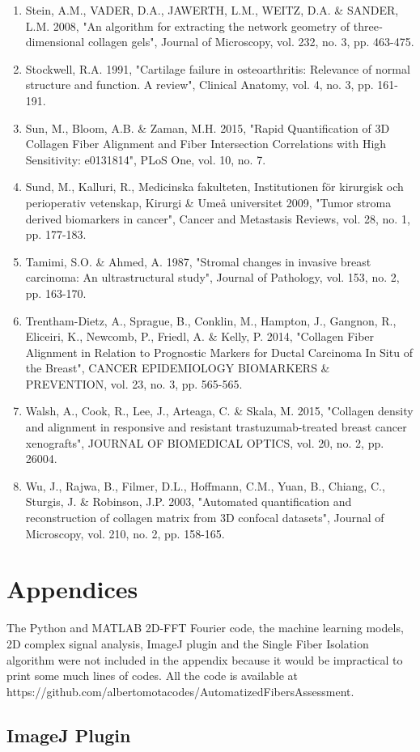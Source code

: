 \documentclass[12pt,a4paper]{article}
\begin{document}
\begin{enumerate}
\item Stein, A.M., VADER, D.A., JAWERTH, L.M., WEITZ, D.A. \& SANDER, L.M. 2008, "An algorithm for extracting the network geometry of three‐dimensional collagen gels", Journal of Microscopy, vol. 232, no. 3, pp. 463-475.
\item Stockwell, R.A. 1991, "Cartilage failure in osteoarthritis: Relevance of normal structure and function. A review", Clinical Anatomy, vol. 4, no. 3, pp. 161-191.
\item Sun, M., Bloom, A.B. \& Zaman, M.H. 2015, "Rapid Quantification of 3D Collagen Fiber Alignment and Fiber Intersection Correlations with High Sensitivity: e0131814", PLoS One, vol. 10, no. 7.
\item Sund, M., Kalluri, R., Medicinska fakulteten, Institutionen för kirurgisk och perioperativ vetenskap, Kirurgi \& Umeå universitet 2009, "Tumor stroma derived biomarkers in cancer", Cancer and Metastasis Reviews, vol. 28, no. 1, pp. 177-183.
\item Tamimi, S.O. \& Ahmed, A. 1987, "Stromal changes in invasive breast carcinoma: An ultrastructural study", Journal of Pathology, vol. 153, no. 2, pp. 163-170.
\item Trentham-Dietz, A., Sprague, B., Conklin, M., Hampton, J., Gangnon, R., Eliceiri, K., Newcomb, P., Friedl, A. \& Kelly, P. 2014, "Collagen Fiber Alignment in Relation to Prognostic Markers for Ductal Carcinoma In Situ of the Breast", CANCER EPIDEMIOLOGY BIOMARKERS \& PREVENTION, vol. 23, no. 3, pp. 565-565.
\item Walsh, A., Cook, R., Lee, J., Arteaga, C. \& Skala, M. 2015, "Collagen density and alignment in responsive and resistant trastuzumab-treated breast cancer xenografts", JOURNAL OF BIOMEDICAL OPTICS, vol. 20, no. 2, pp. 26004.
\item Wu, J., Rajwa, B., Filmer, D.L., Hoffmann, C.M., Yuan, B., Chiang, C., Sturgis, J. \& Robinson, J.P. 2003, "Automated quantification and reconstruction of collagen matrix from 3D confocal datasets", Journal of Microscopy, vol. 210, no. 2, pp. 158-165.

\end{enumerate}

\newpage
\thispagestyle{empty}
\section{Appendices}
The Python and MATLAB 2D-FFT Fourier code, the machine learning models, 2D complex signal analysis, ImageJ plugin and the Single Fiber Isolation algorithm were not included in the appendix because it would be impractical to print some much lines of codes. All the code is available at https://github.com/albertomotacodes/AutomatizedFibersAssessment.

\subsection{ImageJ Plugin}
\renewcommand{\baselinestretch}{1.0}\normalsize
\thispagestyle{empty}


\thispagestyle{empty}
\end{document}
